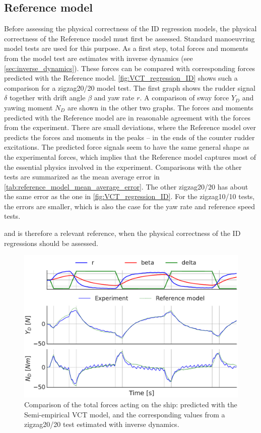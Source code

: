 \subsection{Reference model}
\label{sec:result_VCT_regression}
Before assessing the physical correctness of the ID regression models, the physical correctness of the Reference model must first be assessed. Standard manoeuvring model tests are used for this purpose. As a first step, total forces and moments from the model test are estimates with inverse dynamics (see \autoref{sec:inverse_dynamics}). These forces can be compared with corresponding forces predicted with the Reference model. 
\autoref{fig:VCT_regression_ID} shows such a comparison for a zigzag20/20 model test. The first graph shows the rudder signal $\delta$ together with drift angle $\beta$ and yaw rate $r$. A comparison of sway force $Y_D$ and yawing moment $N_D$ are shown in the other two graphs. The forces and moments predicted with the Reference model are in reasonable agreement with the forces from the experiment. There are small deviations, where the Reference model over predicts the forces and moments in the peaks -- in the ends of the counter rudder excitations. 
The predicted force signals seem to have the same general shape as the experimental forces, which implies that the Reference model captures most of the essential physics involved in the experiment.
Comparisons with the other tests are summarized as the mean average error in \autoref{tab:reference_model_mean_average_error}. The other zigzag20/20 has about the same error as the one in \autoref{fig:VCT_regression_ID}. For the zigzag10/10 tests, the errors are smaller, which is also the case for the yaw rate and reference speed tests.

and is therefore a relevant reference, when the physical correctness of the ID regressions should be assessed. 
\begin{figure}[h!]
    \includegraphics[width=\columnwidth]{figures/result_VCT_regression.VCT_regression_ID.pdf}
    \caption{Comparison of the total forces acting on the ship: predicted with the Semi-empirical VCT model, and the corresponding values from a zigzag20/20 test estimated with inverse dynamics.}
    \label{fig:VCT_regression_ID}
\end{figure}

